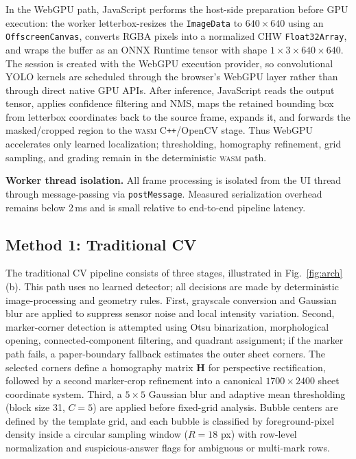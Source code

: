\documentclass[conference]{IEEEtran}
\newcommand{\wasm}{\textsc{wasm}}
\begin{document}
In the WebGPU path, JavaScript performs the host-side preparation before GPU execution: the worker letterbox-resizes the \texttt{ImageData} to $640\times640$ using an \texttt{OffscreenCanvas}, converts RGBA pixels into a normalized CHW \texttt{Float32Array}, and wraps the buffer as an ONNX Runtime tensor with shape $1\times3\times640\times640$. The session is created with the WebGPU execution provider, so convolutional YOLO kernels are scheduled through the browser's WebGPU layer rather than through direct native GPU APIs. After inference, JavaScript reads the output tensor, applies confidence filtering and NMS, maps the retained bounding box from letterbox coordinates back to the source frame, expands it, and forwards the masked/cropped region to the \wasm{} C\texttt{++}/OpenCV stage. Thus WebGPU accelerates only learned localization; thresholding, homography refinement, grid sampling, and grading remain in the deterministic \wasm{} path.

\textbf{Worker thread isolation.}
All frame processing is isolated from the UI thread through message-passing via \texttt{postMessage}.
Measured serialization overhead remains below 2\,ms and is small relative to end-to-end pipeline latency.

\subsection{Method 1: Traditional CV}

The traditional CV pipeline consists of three stages, illustrated in Fig.~\ref{fig:arch}(b). This path uses no learned detector; all decisions are made by deterministic image-processing and geometry rules. First, grayscale conversion and Gaussian blur are applied to suppress sensor noise and local intensity variation. Second, marker-corner detection is attempted using Otsu binarization, morphological opening, connected-component filtering, and quadrant assignment; if the marker path fails, a paper-boundary fallback estimates the outer sheet corners. The selected corners define a homography matrix $\mathbf{H}$ for perspective rectification, followed by a second marker-crop refinement into a canonical $1700\times2400$ sheet coordinate system. Third, a $5\times5$ Gaussian blur and adaptive mean thresholding (block size 31, $C=5$) are applied before fixed-grid analysis. Bubble centers are defined by the template grid, and each bubble is classified by foreground-pixel density inside a circular sampling window ($R=18$ px) with row-level normalization and suspicious-answer flags for ambiguous or multi-mark rows.
\end{document}
